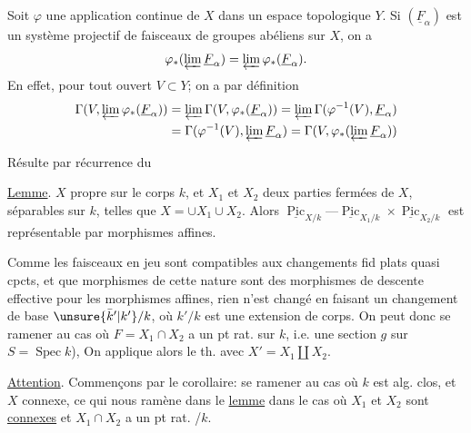 Soit $\varphi$ une application continue de $X$ dans un espace topologique $Y$. Si $(\underline F_\alpha)$ est un système projectif de faisceaux de groupes abéliens sur $X$, on a
\[
\varphi_*(\varprojlim\underline F_\alpha)=\varprojlim\varphi_*(\underline F_\alpha).
\]
En effet, pour tout ouvert $V\subset Y$; on a par définition
\[
\begin{aligned}
\Gamma(V,\varprojlim\varphi_*(\underline F_\alpha))&=\varprojlim\Gamma(V,\varphi_*(\underline F_\alpha))=\varprojlim\Gamma(\varphi^{-1}(V),\underline F_\alpha)\\
&=\Gamma(\varphi^{-1}(V),\varprojlim\underline F_\alpha)=\Gamma(V,\varphi_*(\varprojlim\underline F_\alpha))
\end{aligned}
\]

Résulte par récurrence  du

\uline{Lemme}. $X$  propre sur le corps $k$, et  $X_1$ et $X_2$ deux parties fermées de $X$, séparables sur $k$, telles que $X=\cup X_1\cup X_2$. Alors $\underline{\operatorname{Pic}}_{X/k}\text{---}\underline{\operatorname{Pic}}_{X_1/k}\times\underline{\operatorname{Pic}}_{X_2/k}$ est représentable par morphismes affines.

Comme les faisceaux en jeu sont compatibles  aux changements fid plats quasi cpcts, et que  morphismes de cette nature sont des morphismes de descente effective pour les morphismes affines, rien n'est changé en faisant un changement de base $\unsure{\bar k'|k'}/k$, où $k'/k$ est une extension de corps. On peut donc se ramener au cas où $F=X_1\cap X_2$ a un pt rat. sur $k$, i.e. une section $g$ sur $S=\operatorname{Spec}k$), On applique alors le th. avec $X'=X_1\amalg X_2$.


\uline{Attention}. Commençons par le corollaire: se ramener au cas où $k$ est alg. clos, et $X$ connexe, ce qui nous ramène dans le \uline{lemme} dans le cas où $X_1$ et $X_2$ sont \uline{connexes} et $X_1\cap X_2$ a un pt rat. /$k$. 

